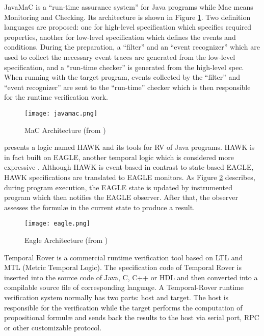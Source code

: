 JavaMaC \citep{kim2004java} is a ``run-time assurance system'' for Java programs while Mac means Monitoring and Checking. Its architecture is shown in Figure \ref{img:javamac}. Two definition languages are proposed: one for high-level specification which specifies required properties, another for low-level specification which defines the events and conditions. During the preparation, a ``filter'' and an ``event recognizer'' which are used to collect the necessary event traces are generated from the low-level specification, and a ``run-time checker'' is generated from the high-level spec. When running with the target program, events collected by the ``filter'' and ``event recognizer'' are sent to the ``run-time'' checker which is then responsible for the runtime verification work.

\begin{figure}[h]
\begin{center}
\centering
\texttt{[image: javamac.png]}
\caption{MaC Architecture (from \cite{kim2004java})}
\label{img:javamac}
\end{center}
\end{figure}

\cite{d2005event} presents a logic named HAWK and its tools for RV of Java programs. HAWK is in fact built on EAGLE, another temporal logic which is considered more expressive \citep{barringer2004rule}. Although HAWK is event-based in contrast to state-based EAGLE, HAWK specifications are translated to EAGLE monitors. As Figure \ref{img:eagle} describes, during program execution, the EAGLE state is updated by instrumented program which then notifies the EAGLE observer. After that, the observer assesses the formul\ae{} in the current state to produce a result. 

\begin{figure}[h]
\begin{center}
\centering
\texttt{[image: eagle.png]}
\caption{Eagle Architecture (from \cite{d2005event})}
\label{img:eagle}
\end{center}
\end{figure}

Temporal Rover \citep{drusinsky2000temporal} is a commercial runtime verification tool based on LTL and MTL (Metric Temporal Logic). The specification code of Temporal Rover is inserted into the source code of Java, C, C++ or HDL and then converted into a compilable source file of corresponding language. A Temporal-Rover runtime verification system normally has two parts: host and target. The host is responsible for the verification while the target performs the computation of propositional formul\ae{} and sends back the results to the host via serial port, RPC or other customizable protocol.

